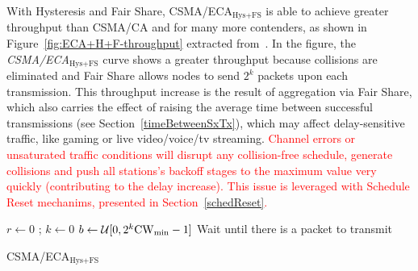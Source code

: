 	With Hysteresis and Fair Share, CSMA/ECA$_{\text{Hys+FS}}$ is able to achieve greater throughput than CSMA/CA and for many more contenders, as shown in Figure~\ref{fig:ECA+H+F-throughput} extracted from~\cite{research2standards}. In the figure, the \emph{CSMA/ECA$_{\text{Hys+FS}}$} curve shows a greater throughput because collisions are eliminated and Fair Share allows nodes to send $2^{k}$ packets upon each transmission. This throughput increase is the result of aggregation via Fair Share, which also carries the effect of raising the average time between successful transmissions (see Section~\ref{timeBetweenSxTx}), which may affect delay-sensitive traffic, like gaming or live video/voice/tv streaming. \textcolor{red}{Channel errors or unsaturated traffic conditions will disrupt any collision-free schedule, generate collisions and push all stations's backoff stages to the maximum value very quickly (contributing to the delay increase). This issue is leveraged with Schedule Reset mechanims, presented in Section~\ref{schedReset}.}

	\begin{algorithm}[tb]
	{
	  $r \leftarrow 0$ ; $k \leftarrow 0$\;
	  $b \leftarrow \mathcal{U}[0,2^k\rm{CW}_{min}-1]$\;
	  Wait until there is a packet to transmit\;
	}	
	\vspace{0.2cm}
	\caption{CSMA/ECA$_{\text{Hys+FS}}$}
	\label{alg:fullECA}
	\end{algorithm}


